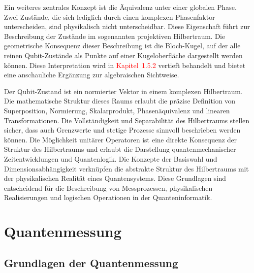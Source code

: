 Ein weiteres zentrales Konzept ist die Äquivalenz unter einer globalen Phase. Zwei Zustände, die sich lediglich durch einen komplexen Phasenfaktor unterscheiden, sind physikalisch nicht unterscheidbar. Diese Eigenschaft führt zur Beschreibung der Zustände im sogenannten projektiven Hilbertraum. Die geometrische Konsequenz dieser Beschreibung ist die Bloch-Kugel, auf der alle reinen Qubit-Zustände als Punkte auf einer Kugeloberfläche dargestellt werden können. Diese Interpretation wird in \textcolor{red}{Kapitel~1.5.2} vertieft behandelt und bietet eine anschauliche Ergänzung zur algebraischen Sichtweise.


Der Qubit-Zustand ist ein normierter Vektor in einem komplexen Hilbertraum. Die mathematische Struktur dieses Raums erlaubt die präzise Definition von Superposition, Normierung, Skalarprodukt, Phasenäquivalenz und linearen Transformationen. Die Vollständigkeit und Separabilität des Hilbertraums stellen sicher, dass auch Grenzwerte und stetige Prozesse sinnvoll beschrieben werden können. Die Möglichkeit unitärer Operatoren ist eine direkte Konsequenz der Struktur des Hilbertraums und erlaubt die Darstellung quantenmechanischer Zeitentwicklungen und Quantenlogik. Die Konzepte der Basiswahl und Dimensionsabhängigkeit verknüpfen die abstrakte Struktur des Hilbertraums mit der physikalischen Realität eines Quantensystems. Diese Grundlagen sind entscheidend für die Beschreibung von Messprozessen, physikalischen Realisierungen und logischen Operationen in der Quanteninformatik.




\section{Quantenmessung }
\subsection{Grundlagen der Quantenmessung}

